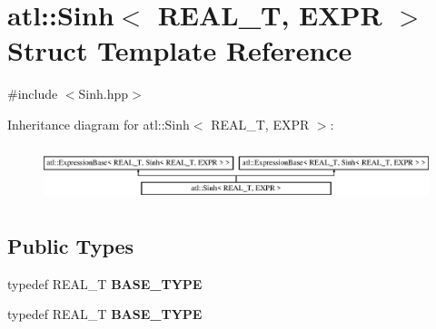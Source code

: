 \hypertarget{structatl_1_1_sinh}{\section{atl\+:\+:Sinh$<$ R\+E\+A\+L\+\_\+\+T, E\+X\+P\+R $>$ Struct Template Reference}
\label{structatl_1_1_sinh}
}


{\ttfamily \#include $<$Sinh.\+hpp$>$}

Inheritance diagram for atl\+:\+:Sinh$<$ R\+E\+A\+L\+\_\+\+T, E\+X\+P\+R $>$\+:\begin{figure}[H]
\begin{center}
\leavevmode
\includegraphics[height=1.623188cm]{structatl_1_1_sinh}
\end{center}
\end{figure}
\subsection*{Public Types}
\begin{DoxyCompactItemize}
\item 
\hypertarget{structatl_1_1_sinh_ab3df219c7affc407e843fb862c3eb909}{typedef R\+E\+A\+L\+\_\+\+T {\bfseries B\+A\+S\+E\+\_\+\+T\+Y\+P\+E}}\label{structatl_1_1_sinh_ab3df219c7affc407e843fb862c3eb909}

\item 
\hypertarget{structatl_1_1_sinh_ab3df219c7affc407e843fb862c3eb909}{typedef R\+E\+A\+L\+\_\+\+T {\bfseries B\+A\+S\+E\+\_\+\+T\+Y\+P\+E}}\label{structatl_1_1_sinh_ab3df219c7affc407e843fb862c3eb909}

\end{DoxyCompactItemize}
